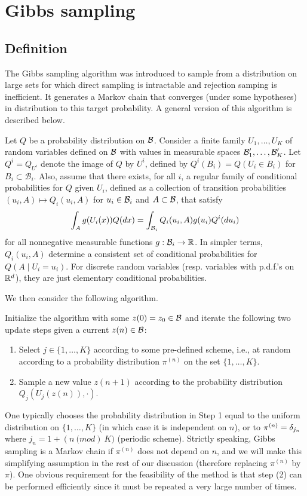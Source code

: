 \section{Gibbs sampling}

\subsection{Definition}
The Gibbs sampling algorithm \citep{geman1984stochastic} was introduced to sample from a distribution on large sets for which direct sampling is intractable and rejection samping is inefficient. It generates a Markov chain that converges (under some hypotheses) in distribution to this target probability. A general version of this algorithm is described below. 

Let $Q$ be  a probability distribution on ${\mathcal B}$. Consider a finite family $U_1, \ldots, U_K$ of random variables defined on ${\mathcal B}$ with values in measurable spaces ${\mathcal B}'_1, \ldots, {\mathcal B}'_K$. Let $Q^i = Q_{U^i}$ denote the image of $Q$ by $U^i$, defined by $Q^i(B_i) = Q(U_i\in B_i)$ for $B_i \subset \mathcal B_i$. Also, assume that there exists, for all $i$, a regular family of conditional probabilities for $Q$ given $U_i$, defined as a collection of transition probabilities $(u_i, A) \mapsto Q_i(u_i, A)$ for $u_i\in {\mathcal B}_i$ and $A\subset {\mathcal B}$, that satisfy
\[
\int_A g(U_i(x)) Q(dx) = \int_{{\mathcal B}_i} Q_i(u_i, A) g(u_i) Q^i(du_i)
\]
for all nonnegative measurable functions $g: {\mathcal B}_i \to {\mathbb{R}}$. In simpler terms, $Q_i(u_i, A)$ determine a consistent set of conditional probabilities for $Q(A\mid U_i = u_i)$. For discrete random variables (resp. variables with p.d.f.'s on ${\mathbb{R}}^d$), they are just elementary conditional probabilities. 


We then consider the following algorithm.
\begin{algorithm}
\label{alg:gibbs.sampling}
 Initialize the algorithm with some $z(0) = z_0\in {\mathcal B}$ and iterate the following two update steps given a current $z(n)\in{\mathcal B}$:
\begin{enumerate}[label= (\arabic*), wide=0.5cm]
    \item Select $j\in \{1, \ldots, K\}$ according to some pre-defined scheme, i.e., at random according to a probability distribution $\pi^{(n)}$ on the set $\{1, \ldots, K\}$. 
    \item Sample a new value $z(n+1)$ according to the probability distribution $Q_j(U_j(z(n)), \cdot)$.
\end{enumerate}
\end{algorithm}
One typically chooses the probability distribution in Step 1 equal to the uniform distribution on $\{1, \ldots, K\}$ (in which case it is independent on $n$), or to $\pi^{(n)} = \delta_{j_n}$ where $j_n = 1 + (n \ \mathrm(mod)\  K)$ (periodic scheme). Strictly speaking, Gibbs sampling is a Markov chain if $\pi^{(n)}$ does not depend on $n$, and we will make this simplifying assumption in the rest of our discussion (therefore replacing  $\pi^{(n)}$ by $\pi$). One obvious requirement for the feasibility of the method is that step (2) can be performed efficiently since it must be repeated a very large number of times.

